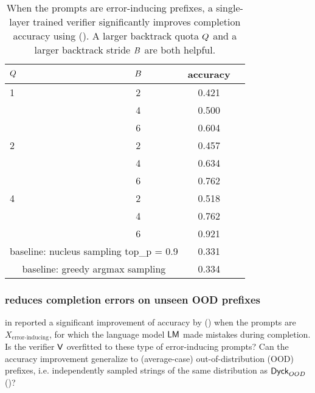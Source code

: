 \begin{table}[h]
\begin{center}
\begin{small}
\begin{tabular}{ lccc }
\toprule
\textbf{$Q$} & \textbf{$B$} & \textbf{accuracy} \\
\hline
1 & 2 & 0.421 \\
\hline
  & 4 & 0.500 \\
\hline
  & 6 & 0.604 \\
\hline
2 & 2 & 0.457 \\
\hline
  & 4 & 0.634 \\
\hline
  & 6 & 0.762 \\
\hline
4 & 2 & 0.518 \\
\hline
  & 4 & 0.762 \\
\hline
  & 6 & 0.921 \\
\hline
\multicolumn{2}{c}{baseline: nucleus sampling top\_p = 0.9} &  0.331  \\ 
\hline
\multicolumn{2}{c}{baseline: greedy argmax sampling} & 0.334 \\
\bottomrule
\end{tabular}
\end{small}
\end{center}
\caption{
When the prompts are error-inducing prefixes,
a single-layer trained verifier significantly improves completion accuracy
using \algoName ().
A larger backtrack quota $Q$
and a larger backtrack stride $B$ 
are both helpful.
}
\label{table:dyck_verifier_error_inducing}
\end{table}





\subsubsection{\algoName reduces completion errors on unseen OOD prefixes}
\label{sec:experiments:synthetic:verifier_reduces_errors_unseen_ood}

 in  reported a significant improvement of accuracy by \algoName () 
when the prompts are $X_{\text{error-inducing}}$,
for which the language model $\mathsf{LM}$ made mistakes during completion.
Is the verifier $\mathsf{V}$ overfitted to these type of error-inducing prompts?
Can the accuracy improvement generalize to (average-case) out-of-distribution (OOD) prefixes,
i.e. independently sampled strings of the same distribution as $\mathsf{Dyck}_{OOD}$ ()?


